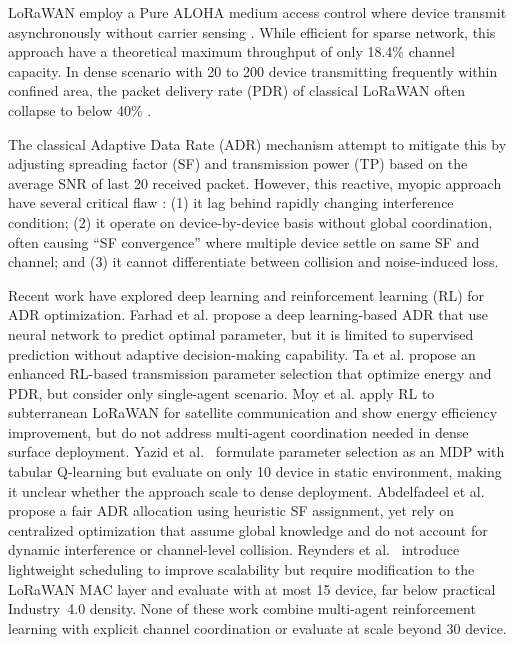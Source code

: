\documentclass[conference]{IEEEtran}
\begin{document}
LoRaWAN employ a Pure ALOHA medium access control where device transmit asynchronously without carrier sensing \cite{georgiou2017low}. While efficient for sparse network, this approach have a theoretical maximum throughput of only 18.4\% channel capacity. In dense scenario with 20 to 200 device transmitting frequently within confined area, the packet delivery rate (PDR) of classical LoRaWAN often collapse to below 40\% \cite{bor2016lora, bankov2016mathematical}.

The classical Adaptive Data Rate (ADR) mechanism attempt to mitigate this by adjusting spreading factor (SF) and transmission power (TP) based on the average SNR of last 20 received packet. However, this reactive, myopic approach have several critical flaw \cite{slabicki2018adaptive}: (1) it lag behind rapidly changing interference condition; (2) it operate on device-by-device basis without global coordination, often causing ``SF convergence'' where multiple device settle on same SF and channel; and (3) it cannot differentiate between collision and noise-induced loss.

Recent work have explored deep learning and reinforcement learning (RL) for ADR optimization. Farhad et al. \cite{farhad2021deep} propose a deep learning-based ADR that use neural network to predict optimal parameter, but it is limited to supervised prediction without adaptive decision-making capability. Ta et al. \cite{ta2023enhanced} propose an enhanced RL-based transmission parameter selection that optimize energy and PDR, but consider only single-agent scenario. Moy et al. \cite{moy2024energy} apply RL to subterranean LoRaWAN for satellite communication and show energy efficiency improvement, but do not address multi-agent coordination needed in dense surface deployment. Yazid et al.~\cite{yazid2022rl} formulate parameter selection as an MDP with tabular Q-learning but evaluate on only 10 device in static environment, making it unclear whether the approach scale to dense deployment. Abdelfadeel et al.~\cite{abdelfadeel2020machine} propose a fair ADR allocation using heuristic SF assignment, yet rely on centralized optimization that assume global knowledge and do not account for dynamic interference or channel-level collision. Reynders et al.~\cite{reynders2018improving} introduce lightweight scheduling to improve scalability but require modification to the LoRaWAN MAC layer and evaluate with at most 15 device, far below practical Industry~4.0 density. None of these work combine multi-agent reinforcement learning with explicit channel coordination or evaluate at scale beyond 30 device.
\end{document}
